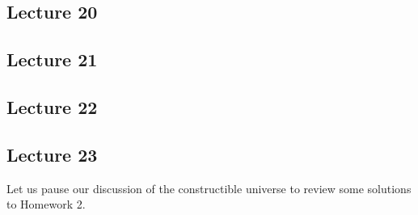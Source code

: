 \documentclass[10pt,letterpaper,cm]{nupset}
\theoremstyle{definition}
\theoremstyle{theorem}
\theoremstyle{remark}
\newcommand{\1}{\mathbf{1}}
\newcommand{\0}{\vec 0}
\begin{document}
\subsection{Lecture 20}

\subsection{Lecture 21}

\subsection{Lecture 22}

\subsection{Lecture 23}

Let us pause our discussion of the constructible universe to review some solutions to Homework 2.
\end{document}
